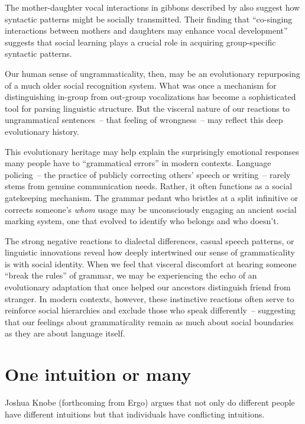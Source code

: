 The mother-daughter vocal interactions in gibbons described by \citet{Koda2013} also suggest how syntactic patterns might be socially transmitted. Their finding that ``co-singing interactions between mothers and daughters may enhance vocal development'' suggests that social learning plays a crucial role in acquiring group-specific syntactic patterns.

Our human sense of ungrammaticality, then, may be an evolutionary repurposing of a much older social recognition system. What was once a mechanism for distinguishing in-group from out-group vocalizations has become a sophisticated tool for parsing linguistic structure. But the visceral nature of our reactions to ungrammatical sentences~-- that feeling of wrongness~-- may reflect this deep evolutionary history.

This evolutionary heritage may help explain the surprisingly emotional responses many people have to ``grammatical errors'' in modern contexts. Language policing~-- the practice of publicly correcting others' speech or writing~-- rarely stems from genuine communication needs. Rather, it often functions as a social gatekeeping mechanism. The grammar pedant who bristles at a split infinitive or corrects someone's \textit{whom} usage may be unconsciously engaging an ancient social marking system, one that evolved to identify who belongs and who doesn't.

The strong negative reactions to dialectal differences, casual speech patterns, or linguistic innovations reveal how deeply intertwined our sense of grammaticality is with social identity. When we feel that visceral discomfort at hearing someone \enquote{break the rules} of grammar, we may be experiencing the echo of an evolutionary adaptation that once helped our ancestors distinguish friend from stranger. In modern contexts, however, these instinctive reactions often serve to reinforce social hierarchies and exclude those who speak differently~-- suggesting that our feelings about grammaticality remain as much about social boundaries as they are about language itself.

\section{One intuition or many}
Joshua Knobe (forthcoming from Ergo) argues that not only do different people have different intuitions but that individuals have conflicting intuitions.
